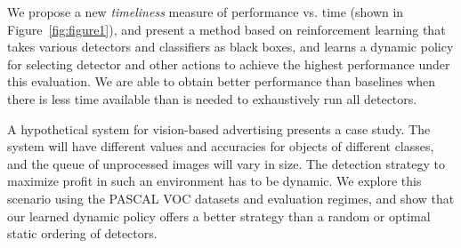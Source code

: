 We propose a new \emph{timeliness} measure of performance vs. time (shown in Figure~\ref{fig:figure1}), and present a method based on reinforcement learning that takes various detectors and classifiers as black boxes, and learns a dynamic policy for selecting detector and other actions to achieve the highest performance under this evaluation.
We are able to obtain better performance than baselines when there is less time available than is needed to exhaustively run all detectors.

A hypothetical system for vision-based advertising presents a case study.
The system will have different values and accuracies for objects of different classes, and the queue of unprocessed images will vary in size.
The detection strategy to maximize profit in such an environment has to be dynamic.
We explore this scenario using the PASCAL VOC datasets and evaluation regimes, and show that our learned dynamic policy offers a better strategy than a random or optimal static ordering of detectors.
